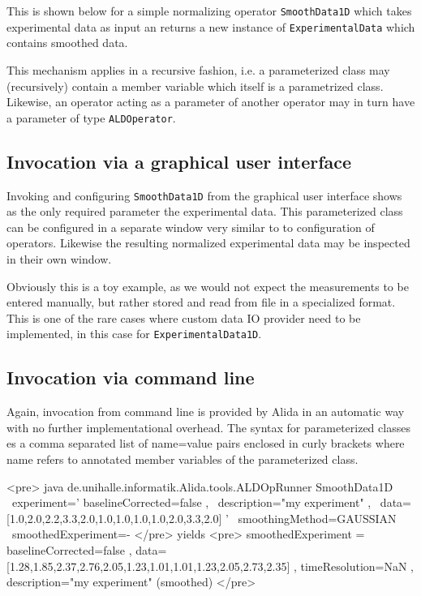 \renewcommand{\codefile}{../../../../../../src/main/java/de/unihalle/informatik/Alida/demo/ExperimentalData1D.java}
\setcounter{off}{54}

This is shown below for a simple normalizing operator \lstinline+SmoothData1D+
which takes experimental data as input an returns a new instance
of \lstinline+ExperimentalData+ which contains smoothed data.

\renewcommand{\codefile}{../../../../../../src/main/java/de/unihalle/informatik/Alida/demo/SmoothData1D.java}
\setcounter{off}{54}


This mechanism applies in a recursive fashion, i.e. a parameterized class may
(recursively) contain a member variable which itself is a parametrized class.
Likewise, an operator acting as a parameter of another operator
may in turn have a parameter of type \lstinline+ALDOperator+.

\subsection{  Invocation via a graphical user interface}

Invoking and configuring \lstinline+SmoothData1D+ from the graphical user interface
shows as the only required parameter the experimental data.
This parameterized class can be configured in a separate  window
very similar to to configuration of operators.
Likewise the resulting normalized experimental data
may be inspected in their own window.

Obviously this is a toy example, as we would not expect the measurements to
be entered manually, but rather stored and read from file in a specialized format.
This is one of the rare cases where 
custom data IO provider need to be implemented, in this
case for \lstinline+ExperimentalData1D+.


\subsection{  Invocation via command line}

Again, invocation from command line is provided by Alida in an automatic
way with no further implementational overhead.
The syntax for parameterized classes es a comma separated list of name=value pairs
enclosed in curly brackets where name refers to annotated member variables of
the parameterized class.

<pre>
java de.unihalle.informatik.Alida.tools.ALDOpRunner SmoothData1D \
	experiment='{ baselineCorrected=false , \
                      description="my experiment" , \
                      data=[1.0,2.0,2.2,3.3,2.0,1.0,1.0,1.0,1.0,2.0,3.3,2.0] }' \
        smoothingMethod=GAUSSIAN \
	smoothedExperiment=-
</pre>
yields
<pre>
smoothedExperiment = { baselineCorrected=false , 
    data=[1.28,1.85,2.37,2.76,2.05,1.23,1.01,1.01,1.23,2.05,2.73,2.35] , 
    timeResolution=NaN , 
    description="my experiment" (smoothed) }
</pre>


